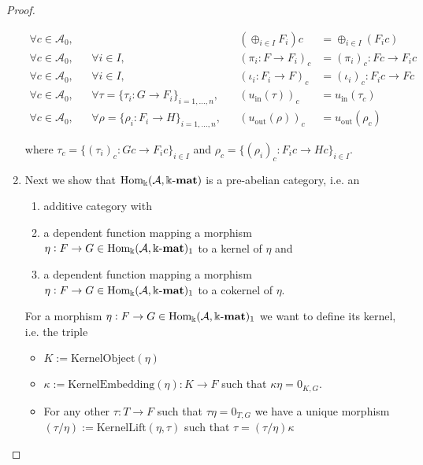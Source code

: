 \begin{proof}
\begin{enumerate}
\begin{subproof}[Proof of (ii)]
\begin{align*}
\forall c \in \mathcal{A}_{0},&& &&  (\oplus_{i \in I} F_{i}) c &= \oplus_{i \in I} (F_{i} c) \\
\forall c \in \mathcal{A}_{0},&& \forall i \in I,&& (\pi_{i} : F \rightarrow F_{i})_{c} &= (\pi_{i})_{c} : Fc \rightarrow F_{i} c \\
\forall c \in \mathcal{A}_{0},&& \forall i \in I,&& (\iota_{i} : F_{i} \rightarrow F)_{c} &= (\iota_{i})_{c} : F_{i} c \rightarrow Fc \\
\forall c \in \mathcal{A}_{0},&& \forall \tau = \{ \tau_{i} : G \rightarrow F_{i} \}_{i = 1,\dots,n},&&
(u_{\mathrm{in}}(\tau))_{c} &= u_{\mathrm{in}}(\tau_{c}) \\
\forall c \in \mathcal{A}_{0},&& \forall \rho = \{ \rho_{i} : F_{i} \rightarrow H \}_{i = 1,\dots,n},&&
(u_{\mathrm{out}}(\rho))_{c} &= u_{\mathrm{out}}(\rho_{c})
\end{align*}

where $\tau_{c} = \{ (\tau_{i})_{c} : Gc \rightarrow F_{i}c \}_{i \in I}$ and $\rho_{c} = \{ (\rho_{i})_{c} : F_{i} c \rightarrow Hc \}_{i \in I}$.

\end{subproof}

\item Next we show that $\mathrm{Hom_{\Bbbk}}(\mathcal{A},\Bbbk\textnormal{-}\mathbf{mat})$ is a pre-abelian category, i.e. an
\begin{enumerate}
\renewcommand{\labelenumii}{(\roman{enumii})}
\item additive category with
\item a dependent function mapping a morphism $\eta : F \rightarrow G \in \mathrm{Hom_{\Bbbk}}(\mathcal{A},\Bbbk\textnormal{-}\mathbf{mat})_{1}$ to a kernel of $\eta$ and
\item a dependent function mapping a morphism $\eta : F \rightarrow G \in \mathrm{Hom_{\Bbbk}}(\mathcal{A},\Bbbk\textnormal{-}\mathbf{mat})_{1}$ to a cokernel of $\eta$.
\end{enumerate}
\begin{subproof}
For a morphism $\eta : F \rightarrow G \in \mathrm{Hom_{\Bbbk}}(\mathcal{A},\Bbbk\textnormal{-}\mathbf{mat})_{1}$ we want to define its kernel, i.e. the triple
\begin{itemize}
\item $K := \mathrm{KernelObject}(\eta)$
\item $\kappa := \mathrm{KernelEmbedding}(\eta) : K \rightarrow F$ such that $\kappa \eta = 0_{K,G}$.
\item For any other $\tau : T \rightarrow F$ such that $\tau\eta = 0_{T,G}$ we have a unique morphism
$(\tau / \eta) := \mathrm{KernelLift}(\eta,\tau)$ such that $\tau = (\tau / \eta) \kappa$
\end{itemize}


\end{subproof}
\end{enumerate}
\end{proof}

